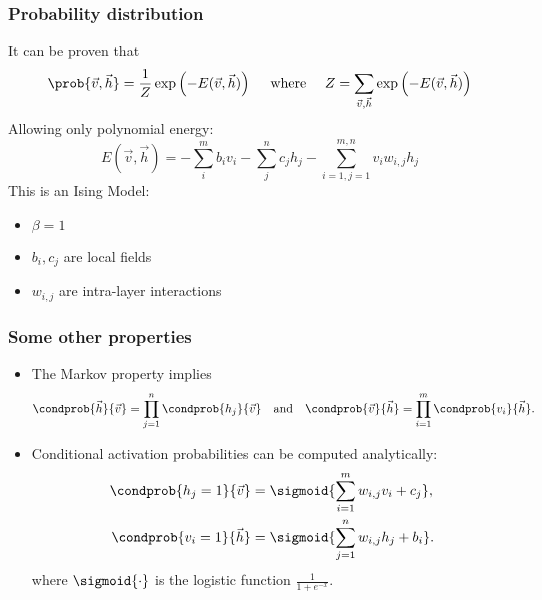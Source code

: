 \begin{frame}
  \frametitle{Probability distribution}
	It can be proven that
	\[\prob{\vec{v}, \vec{h}} = \frac{1}{Z} \exp\left(-E(\vec{v}, \vec{h})\right)
	\quad\text{ where }\quad
	Z = \sum_{\vec{v}, \vec{h}}\exp\left(-E(\vec{v}, \vec{h})\right)\]
	\pause
	Allowing only polynomial energy:
	\[
	E(\vec{v}, \vec{h}) = -\sum_{i}^m b_i v_i - \sum_{j}^n c_j h_j -
	\sum_{i=1,j=1}^{m,n} v_i w_{i,j} h_j
	\]
  \pause
  This is an \alert{Ising Model}:
  \begin{itemize}
    \item \(\beta = 1\)
    \item \(b_i, c_j\) are local fields
    \item \(w_{i,j}\) are intra-layer interactions
  \end{itemize}
\end{frame}

\begin{frame}
  \frametitle{Some other properties}
  \begin{itemize}
    \item<1-> The Markov property implies
      \[
        \condprob{\vec{h}}{\vec{v}} = \prod_{j=1}^n \condprob{h_j}{\vec{v}} \quad\text{and}\quad
        \condprob{\vec{v}}{\vec{h}} = \prod_{i=1}^m \condprob{v_i}{\vec{h}}.
      \]
    \item<2-> Conditional activation probabilities can be computed analytically:
      \begin{align*}
        \condprob{h_j=1}{\vec{v}} &= \sigmoid{\sum_{i=1}^m w_{i,j}v_i+c_j},\\
        \condprob{v_i=1}{\vec{h}} &= \sigmoid{\sum_{j=1}^n w_{i,j}h_j+b_i}.
      \end{align*}
      where \(\sigmoid{\cdot}\) is the \alert{logistic function} \(\frac{1}{1+e^{-x}}\).
  \end{itemize}
\end{frame}


